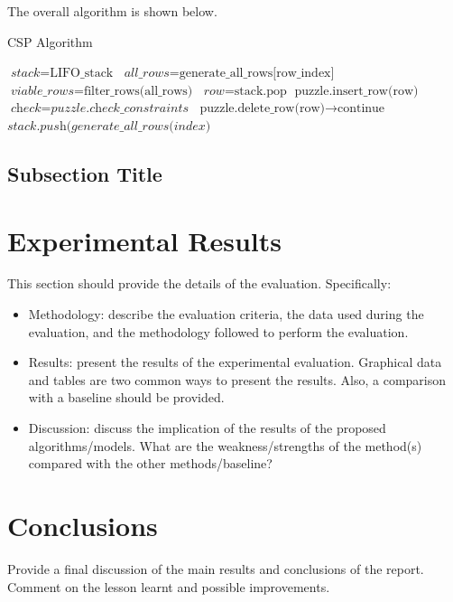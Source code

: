 \documentclass{svproc}
\begin{document}
The overall algorithm is shown below.

\begin{algorithm}
    \caption{CSP Algorithm}\label{euclid}
    \begin{algorithmic}[1]
        \State $\textit{stack} = \text{LIFO\_stack}$
        \State $\textit{all\_rows} = \text{generate\_all\_rows[row\_index]}$
        \State $\textit{viable\_rows} = \text{filter\_rows(all\_rows)}$
        \State $\textit{row} = \text{stack.pop}$
        \State $\text{puzzle.insert\_row(row)}$
        \State $\textit{check} = \textit{puzzle.check\_constraints}$
        \State $\text{puzzle.delete\_row(row)} \to \text{continue}$
        \EndIf
        \State $\textit{stack.push(generate\_all\_rows(index)}$
        \EndWhile
        \EndWhile
    \end{algorithmic}
\end{algorithm}

\subsection{Subsection Title}


\section{Experimental Results}
	This section should provide the details of the evaluation. Specifically:
\begin{itemize}
	\item Methodology: describe the evaluation criteria, the data used during the evaluation, and the methodology followed to perform the evaluation.
	\item Results: present the results of the experimental evaluation. Graphical data and tables are two common ways to present the results. Also, a comparison with a baseline should be provided.
	\item Discussion: discuss the implication of the results of the proposed algorithms/models. What are the weakness/strengths of the method(s) compared with the other methods/baseline?
\end{itemize}


\section{Conclusions}
Provide a final discussion of the main results and conclusions of the report. Comment on the lesson learnt and possible improvements.
\end{document}

